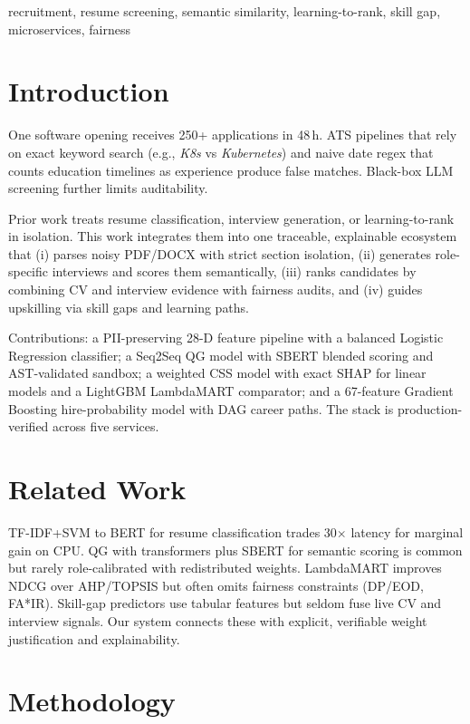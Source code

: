 \documentclass[conference]{IEEEtran}
\begin{document}
\begin{IEEEkeywords}
recruitment, resume screening, semantic similarity, learning-to-rank, skill gap, microservices, fairness
\end{IEEEkeywords}

\section{Introduction}
One software opening receives 250+ applications in 48\,h. ATS pipelines that rely on exact keyword search (e.g., \textit{K8s} vs \textit{Kubernetes}) and naive date regex that counts education timelines as experience produce false matches. Black-box LLM screening further limits auditability.

Prior work treats resume classification, interview generation, or learning-to-rank in isolation. This work integrates them into one traceable, explainable ecosystem that (i) parses noisy PDF/DOCX with strict section isolation, (ii) generates role-specific interviews and scores them semantically, (iii) ranks candidates by combining CV and interview evidence with fairness audits, and (iv) guides upskilling via skill gaps and learning paths.

Contributions: a PII-preserving 28-D feature pipeline with a balanced Logistic Regression classifier; a Seq2Seq QG model with SBERT blended scoring and AST-validated sandbox; a weighted CSS model with exact SHAP for linear models and a LightGBM LambdaMART comparator; and a 67-feature Gradient Boosting hire-probability model with DAG career paths. The stack is production-verified across five services.

\section{Related Work}
TF-IDF+SVM to BERT for resume classification trades 30$\times$ latency for marginal gain on CPU. QG with transformers plus SBERT for semantic scoring is common but rarely role-calibrated with redistributed weights. LambdaMART improves NDCG over AHP/TOPSIS but often omits fairness constraints (DP/EOD, FA*IR). Skill-gap predictors use tabular features but seldom fuse live CV and interview signals. Our system connects these with explicit, verifiable weight justification and explainability.

\section{Methodology}
\end{document}
